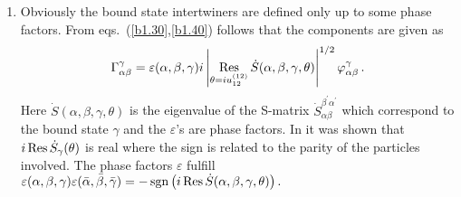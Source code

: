 \documentclass[a4paper,a4paper]{article}
\begin{document}
\begin{enumerate}
\item  Obviously the bound state intertwiners are defined only up to some
phase factors. From eqs.~(\ref{b1.30},\ref{b1.40}) follows that the
components are given as 
\[
\Gamma _{\alpha \beta }^{\gamma }=\varepsilon (\alpha ,\beta ,\gamma
)i\left| \mathop{\rm Res}_{\theta =iu_{12}^{(12)}}\dot{S}(\alpha ,\beta
,\gamma ,\theta )\right| ^{1/2}\varphi _{\alpha \beta }^{\gamma }\,. 
\]
Here $\dot{S}(\alpha ,\beta ,\gamma ,\theta )$ is the eigenvalue of the
S-matrix $\dot{S}_{\alpha \beta }^{\beta ^{\prime }\alpha ^{\prime }}$ which
correspond to the bound state $\gamma $ and the $\varepsilon $'s are phase
factors. In \cite{K1} it was shown that $i\mathop{\rm Res}\dot{S}_{\gamma
}(\theta )$ is real where the sign is related to the parity of the particles
involved. The phase factors $\varepsilon $ fulfill $\varepsilon (\alpha
,\beta ,\gamma )\varepsilon (\bar{\alpha},\bar{\beta},\bar{\gamma}%
)\allowbreak =-\mathop{\rm sgn}\left( i\mathop{\rm Res}\dot{S}(\alpha ,\beta
,\gamma ,\theta )\right) .$
\end{enumerate}
\end{document}
